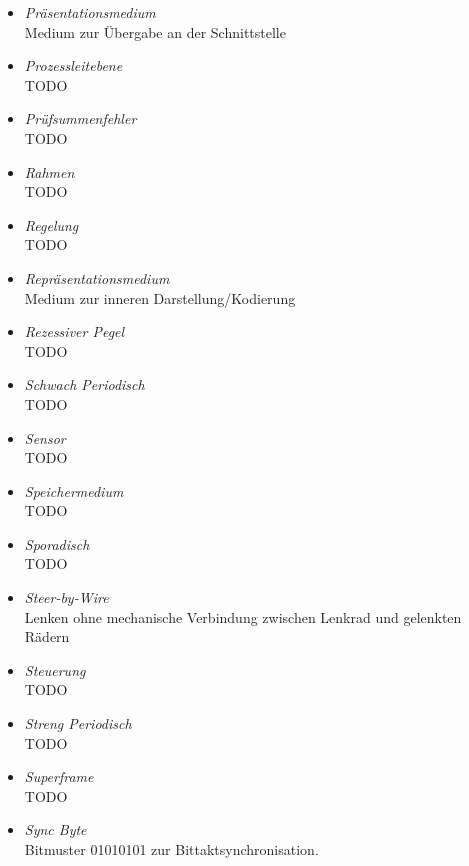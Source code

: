 \documentclass{article}
\begin{document}
\begin{itemize}
	\item \emph{Präsentationsmedium}\\
		Medium zur Übergabe an der Schnittstelle

	\item \emph{Prozessleitebene}\\
		TODO

	\item \emph{Prüfsummenfehler}\\
		TODO

	\item \emph{Rahmen}\\
		TODO

	\item \emph{Regelung}\\
		TODO

	\item \emph{Repräsentationsmedium}\\
		Medium zur inneren Darstellung/Kodierung
	
	\item \emph{Rezessiver Pegel}\\
		TODO

	\item \emph{Schwach Periodisch}\\
		TODO

	\item \emph{Sensor}\\
		TODO

	\item \emph{Speichermedium}\\
		TODO

	\item \emph{Sporadisch}\\
		TODO

	\item \emph{Steer-by-Wire}\\
		Lenken ohne mechanische Verbindung zwischen Lenkrad und gelenkten Rädern
	
	\item \emph{Steuerung}\\
		TODO

	\item \emph{Streng Periodisch}\\
		TODO

	\item \emph{Superframe}\\
		TODO

	\item \emph{Sync Byte}\\
		Bitmuster 01010101 zur Bittaktsynchronisation.


\end{itemize}
\end{document}
